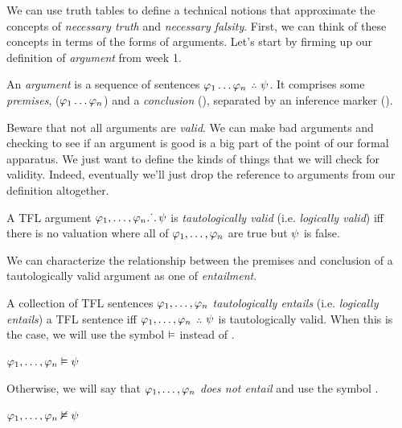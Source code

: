 We can use truth tables to define a technical notions that approximate the
concepts of \emph{necessary truth} and \emph{necessary falsity}. First, we can
think of these concepts in terms of the forms of arguments. Let's start by
firming up our definition of \emph{argument} from week 1.

\begin{definition}[Argument]
  \label{def:tfl-argument}
  An \emph{argument} is a sequence of sentences
  $\varphi_1\dots\varphi_n$ $\therefore$ $\psi$. It comprises some \emph{premises},
  ($\varphi_1\dots\varphi_n$) and a \emph{conclusion} (\epsi), separated by an
  inference marker (\therefore).
\end{definition}

Beware that not all arguments are \emph{valid}. We can make bad arguments and
checking to see if an argument is good is a big part of the point of our formal
apparatus. We just want to define the kinds of things that we will check for
validity. Indeed, eventually we'll just drop the reference to arguments from our
definition altogether.

\begin{definition}
  \label{def:tfl-tautologically-valid}
  A TFL argument $\varphi_1,\dots,\varphi_n \ldotp\dot{}\,\ldotp \psi$ is
  \emph{tautologically valid} (i.e. \emph{logically valid}) iff there is no
  valuation where all of $\varphi_1,\dots,\varphi_n$ are true but $\psi$ is false.
\end{definition}

We can characterize the relationship between the premises and conclusion of
a tautologically valid argument as one of \emph{entailment}.

\begin{definition}
  \label{def:tfl-tautologically-entail}
  A collection of TFL sentences $\varphi_1,\dots,\varphi_n$ \emph{tautologically
  entails} (i.e. \emph{logically entails}) a TFL sentence \epsi iff
  $\varphi_1,\dots,\varphi_n$ $\therefore$ $\psi$ is tautologically valid. When
  this is the case, we will use the symbol $\vDash$ instead of \therefore.

  \begin{argument}
    \item[ ] $\varphi_1,\dots,\varphi_n \vDash \psi$
  \end{argument}

  Otherwise, we will say that $\varphi_1,\dots,\varphi_n$ \emph{does not entail}
  \epsi and use the symbol \enotentails.

    \begin{argument}
    \item[ ] $\varphi_1,\dots,\varphi_n \nvDash \psi$
    \end{argument}
\end{definition}

